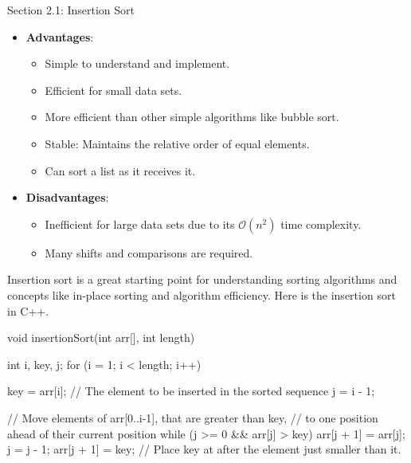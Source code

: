 \begin{notes}{Section 2.1: Insertion Sort}
\begin{itemize}
        \begin{itemize}
            \item Small Lists: It's efficient for small data sets.
            \item Partially Sorted Lists: It's efficient if the list is already partially sorted.
            \item Online Algorithms: It can sort the list as it receives it, making it useful in situations where the complete list of data isn't available initially (online algorithms).
        \end{itemize}
        \item \textbf{Advantages}:
        \begin{itemize}
            \item Simple to understand and implement.
            \item Efficient for small data sets.
            \item More efficient than other simple algorithms like bubble sort.
            \item Stable: Maintains the relative order of equal elements.
            \item Can sort a list as it receives it.
        \end{itemize}
        \item \textbf{Disadvantages}:
        \begin{itemize}
            \item Inefficient for large data sets due to its $\mathcal{O}(n^{2})$ time complexity.
            \item Many shifts and comparisons are required.
        \end{itemize}
    \end{itemize}

    Insertion sort is a great starting point for understanding sorting algorithms and concepts like in-place sorting and algorithm efficiency. Here is the insertion sort in C++.

    \begin{code}[C++]
    void insertionSort(int arr[], int length) {
        int i, key, j;
        for (i = 1; i < length; i++) {
            key = arr[i]; // The element to be inserted in the sorted sequence
            j = i - 1;
    
            // Move elements of arr[0..i-1], that are greater than key,
            // to one position ahead of their current position
            while (j >= 0 && arr[j] > key) {
                arr[j + 1] = arr[j];
                j = j - 1;
            }
            arr[j + 1] = key; // Place key at after the element just smaller than it.
        }
    }
    \end{code}
\end{notes}

